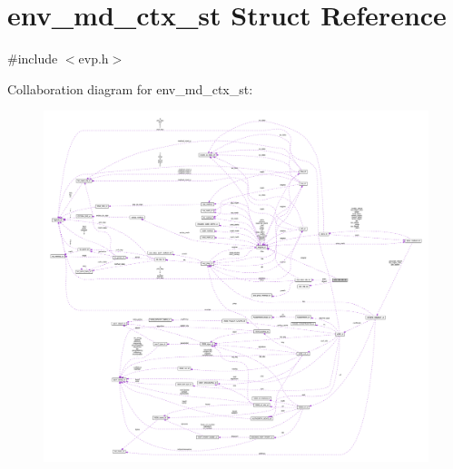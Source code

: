 \hypertarget{structenv__md__ctx__st}{}\section{env\+\_\+md\+\_\+ctx\+\_\+st Struct Reference}
\label{structenv__md__ctx__st}


{\ttfamily \#include $<$evp.\+h$>$}



Collaboration diagram for env\+\_\+md\+\_\+ctx\+\_\+st\+:\nopagebreak
\begin{figure}[H]
\begin{center}
\leavevmode
\includegraphics[width=350pt]{structenv__md__ctx__st__coll__graph}
\end{center}
\end{figure}
